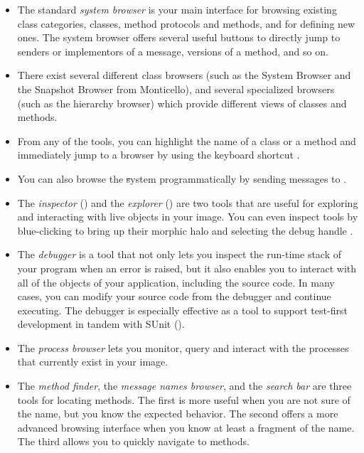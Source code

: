 \documentclass[a4paper,10pt,twoside]{book}
\begin{document}
\begin{itemize}
  \item The standard \emph{system browser} is your main interface for browsing existing class categories, classes, method protocols and methods, and for defining new ones.
  The system browser offers several useful buttons to directly jump to senders or implementors of a message, versions of a method, and so on.
  \item There exist several different class browsers (such as the System Browser and the Snapshot Browser from Monticello), and several specialized browsers (such as the hierarchy browser) which provide different views of classes and methods.
  \item From any of the tools, you can highlight the name of a class or a method and immediately jump to a browser by using the keyboard shortcut .
  \item You can also browse the \st system programmatically by sending messages to .
  \item The \emph{inspector} () and the \emph{explorer} () are two tools that are useful for exploring and interacting with live objects in your image.
  You can even inspect tools by blue-clicking to bring up their morphic halo and selecting the debug handle \debugHandle.
  \item The \emph{debugger} is a tool that not only lets you inspect the run-time stack of your program when an error is raised, but it also enables you to interact with all of the objects of your application, including the source code.
  In many cases, you can modify your source code from the debugger and continue executing.
  The debugger is especially effective as a tool to support test-first development in tandem with SUnit ().
  \item The \emph{process browser} lets you monitor, query and interact with the processes that currently exist in your image.
  \item The \emph{method finder}, the \emph{message names browser}, and the \emph{search bar} are three tools for locating methods.
  The first is more useful when you are not sure of the name, but you know the expected behavior.
  The second offers a more advanced browsing interface when you know at least a fragment of the name.
  The third allows you to quickly navigate to methods.
\end{itemize}

\ifx\wholebook\relax\else
\end{document}
